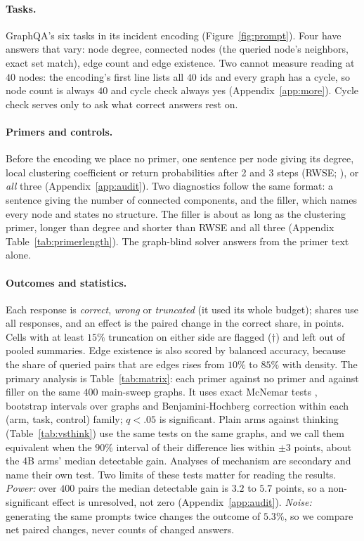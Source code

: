 \documentclass[11pt]{article}
\begin{document}
\paragraph{Tasks.} GraphQA's six tasks in its incident encoding (Figure~\ref{fig:prompt}). Four have answers that vary: node degree, connected nodes (the queried node's neighbors, exact set match), edge count and edge existence. Two cannot measure reading at $40$ nodes: the encoding's first line lists all $40$ ids and every graph has a cycle, so node count is always $40$ and cycle check always yes (Appendix~\ref{app:more}). Cycle check serves only to ask what correct answers rest on. %

\paragraph{Primers and controls.} Before the encoding we place no primer, one sentence per node giving its degree, local clustering coefficient or return probabilities after 2 and 3 steps (RWSE; \citealp{dwivedi2022graph}), or \emph{all} three (Appendix~\ref{app:audit}). Two diagnostics follow the same format: a sentence giving the number of connected components, and the filler, which names every node and states no structure. The filler is about as long as the clustering primer, longer than degree and shorter than RWSE and all three (Appendix Table~\ref{tab:primerlength}). The graph-blind solver answers from the primer text alone.

\paragraph{Outcomes and statistics.} Each response is \emph{correct}, \emph{wrong} or \emph{truncated} (it used its whole budget); shares use all responses, and an effect is the paired change in the correct share, in points. Cells with at least $15\%$ truncation on either side are flagged ($\dagger$) and left out of pooled summaries. Edge existence is also scored by balanced accuracy, because the share of queried pairs that are edges rises from $10\%$ to $85\%$ with density. %
The primary analysis is Table~\ref{tab:matrix}: each primer against no primer and against filler on the same $400$ main-sweep graphs. It uses exact McNemar tests \citep{mcnemar1947note}, bootstrap intervals over graphs and Benjamini-Hochberg correction \citep{benjaminihochberg1995controlling} within each (arm, task, control) family; $q<.05$ is significant. Plain arms against thinking (Table~\ref{tab:vsthink}) use the same tests on the same graphs, and we call them equivalent when the $90\%$ interval of their difference lies within $\pm3$ points, about the 4B arms' median detectable gain. Analyses of mechanism are secondary and name their own test. Two limits of these tests matter for reading the results. \emph{Power:} over $400$ pairs the median detectable gain is $3.2$ to $5.7$ points, so a non-significant effect is unresolved, not zero (Appendix~\ref{app:audit}). %
\emph{Noise:} generating the same prompts twice changes the outcome of $5.3\%$, so we compare net paired changes, never counts of changed answers. %
\end{document}
